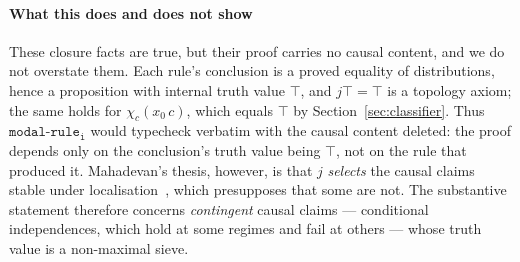 \documentclass{lmcs}
\begin{document}
\paragraph{What this does and does not show}
These closure facts are true, but their proof carries no causal content, and we do not overstate them.
Each rule's conclusion is a proved equality of distributions, hence a proposition with internal truth value $\top$, and $j\top = \top$ is a topology axiom; the same holds for $\chi_c(x_0\,c)$, which equals $\top$ by Section~\ref{sec:classifier}.
Thus $\mathtt{modal\text{-}rule_i}$ would typecheck verbatim with the causal content deleted: the proof depends only on the conclusion's truth value being $\top$, not on the rule that produced it.
Mahadevan's thesis, however, is that $j$ \emph{selects} the causal claims stable under localisation~\cite{mahadevan-2025b}, which presupposes that some are not.
The substantive statement therefore concerns \emph{contingent} causal claims --- conditional independences, which hold at some regimes and fail at others --- whose truth value is a non-maximal sieve.
\end{document}
